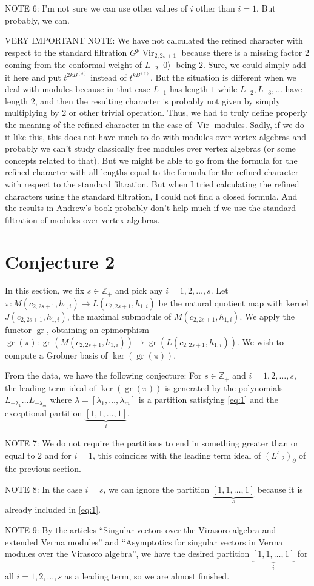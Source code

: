 \documentclass[a4paper, 12pt, reqno]{amsart}
\DeclareMathOperator{\Vir}{Vir}
\DeclareMathOperator{\vac}{|0\rangle}
\DeclareMathOperator{\gr}{gr}
\begin{document}
NOTE 6: I'm not sure we can use other values of $i$ other than $i = 1$.
But probably, we can.

VERY IMPORTANT NOTE: We have not calculated the refined character with respect to the standard filtration $G^p\Vir_{2, 2s + 1}$ because there is a missing factor $2$ coming from the conformal weight of $L_{-2}\vac$ being $2$.
Sure, we could simply add it here and put $t^{2kB^{(s)}}$ instead of $t^{kB^{(s)}}$.
But the situation is different when we deal with modules because in that case $L_{-1}$ has length $1$ while $L_{-2}, L_{-3}, \dots$ have length $2$, and then the resulting character is probably not given by simply multiplying by $2$ or other trivial operation.
Thus, we had to truly define properly the meaning of the refined character in the case of $\Vir$-modules.
Sadly, if we do it like this, this does not have much to do with modules over vertex algebras and probably we can't study classically free modules over vertex algebras (or some concepts related to that).
But we might be able to go from the formula for the refined character with all lengths equal to the formula for the refined character with respect to the standard filtration.
But when I tried calculating the refined characters using the standard filtration, I could not find a closed formula.
And the results in Andrew's book probably don't help much if we use the standard filtration of modules over vertex algebras.

\section{Conjecture 2}
\label{sec:conjecture-2}

In this section, we fix $s \in \mathbb{Z}_+$ and pick any $i = 1, 2, \dots, s$.
Let $\pi: M(c_{2, 2s + 1}, h_{1, i}) \to L(c_{2, 2s + 1}, h_{1, i})$ be the natural quotient map with kernel $J(c_{2, 2s + 1}, h_{1, i})$, the maximal submodule of $M(c_{2, 2s + 1}, h_{1, i})$.
We apply the functor $\gr$, obtaining an epimorphism $\gr(\pi): \gr(M(c_{2, 2s + 1}, h_{1, i})) \to \gr(L(c_{2, 2s + 1}, h_{1, i}))$.
We wish to compute a Grobner basis of $\ker(\gr(\pi))$.

From the data, we have the following conjecture: For $s \in \mathbb{Z}_+$ and $i = 1, 2, \dots, s$, the leading term ideal of $\ker(\gr(\pi))$ is generated by the polynomials $L_{-\lambda_1} \dots L_{-\lambda_m}$ where $\lambda = [\lambda_1, \dots, \lambda_m]$ is a partition satisfying \eqref{eq:1} and the exceptional partition $\underbrace{[1, 1, \dots, 1]}_i$.

NOTE 7: We do not require the partitions to end in something greater than or equal to $2$ and for $i = 1$, this coincides with the leading term ideal of $(L_{-2}^s)_{\partial}$ of the previous section.

NOTE 8: In the case $i = s$, we can ignore the partition $\underbrace{[1, 1, \dots, 1]}_s$ because it is already included in \eqref{eq:1}.

NOTE 9: By the articles ``Singular vectors over the Virasoro algebra and extended Verma modules'' and ``Asymptotics for singular vectors in Verma
modules over the Virasoro algebra'', we have the desired partition $\underbrace{[1, 1, \dots, 1]}_i$ for all $i = 1, 2, \dots, s$ as a leading term, so we are almost finished.
\end{document}
